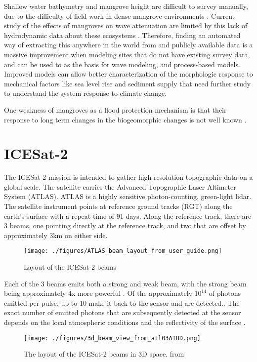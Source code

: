 Shallow water bathymetry and mangrove height are difficult to survey manually, due to the difficulty of field work in dense mangrove environments \parencite{Gijsman2021}. Current study of the effects of mangroves on wave attenuation are limited by this lack of hydrodynamic data about these ecosystems \parencite{Horstman2014}.  Therefore, finding an automated way of extracting this anywhere in the world from and publicly available data is a massive improvement when modeling sites that do not have existing survey data, and can be used to as the basis for wave modeling, and process-based models. Improved models can allow better characterization of the morphologic response to mechanical factors like sea level rise and sediment supply that need further study to understand the system response to climate change.

One weakness of mangroves as a flood protection mechanism is that their response to long term changes in the biogeomorphic changes is not well known \parencite{Gijsman2021}.

\section{ICESat-2}

The ICESat-2 mission is intended to gather high resolution topographic data on a global scale. The satellite carries the Advanced Topographic Laser Altimeter System (ATLAS). ATLAS is a highly sensitive photon-counting, green-light lidar. The satellite instrument points at reference ground tracks (RGT) along the earth's surface with a repeat time of 91 days. Along the reference track, there are 3 beams, one pointing directly at the reference track, and two that are offset by approximately 3km on either side.

\begin{figure}
      \centering
      \texttt{[image: ./figures/ATLAS\_beam\_layout\_from\_user\_guide.png]}
      \caption{Layout of the ICESat-2 beams}
\end{figure}

Each of the 3 beams emits both a strong and weak beam, with the strong beam being approximately 4x more powerful \parencite{Neumann2019d}. Of the approximately \(10^{14}\) of photons emitted per pulse, up to  10 make it back to the sensor and are detected.\parencite{Neumann2019d}. The exact number of emitted photons that are subsequently detected at the sensor depends on the local atmospheric conditions and the reflectivity of the surface \parencite{Neumann2019e}.
\begin{figure}[htbp]
      \centering
      \texttt{[image: ./figures/3d\_beam\_view\_from\_atl03ATBD.png]}
      \caption{The layout of the ICESat-2 beams in 3D space. from \cite{Neumann2019d}}
      \label{3d-beams}
\end{figure}


